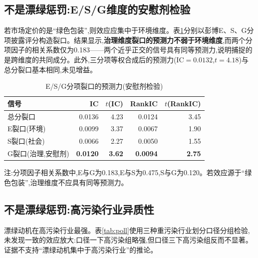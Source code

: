 \documentclass[UTF8, a4paper, fontset=fandol, zihao=-4]{ctexart}
\begin{document}
\subsection{不是漂绿惩罚:E/S/G维度的安慰剂检验}

若市场定价的是“绿色包装”,则效应应集中于环境维度。表\ref{tab:esg}分别以彭博E、S、G分项披露评分构造裂口。结果显示,\textbf{治理维度裂口的预测力不弱于环境维度},而两个分项因子的相关系数仅为0.183——两个近乎正交的信号具有同等预测力,说明捕捉的是跨维度的共同成分。此外,三分项等权合成后的预测力(IC${}=0.0132$,$t=4.18$)与总分裂口基本相同,未见增益。

\begin{table}[H]
\centering
\begin{threeparttable}
\caption{E/S/G分项裂口的预测力(安慰剂检验)}\label{tab:esg}
\begin{tabular}{lrrrr}
\toprule
信号 & IC & $t$(IC) & RankIC & $t$(RankIC) \\
\midrule
总分裂口 & 0.0136 & 4.23 & 0.0124 & 3.45 \\
E裂口(环境) & 0.0099 & 3.37 & 0.0067 & 1.90 \\
S裂口(社会) & 0.0066 & 2.27 & 0.0050 & 1.55 \\
G裂口(治理,安慰剂) & \textbf{0.0120} & \textbf{3.62} & \textbf{0.0094} & \textbf{2.75} \\
\bottomrule
\end{tabular}
\begin{tablenotes}
\item 注:分项因子相关系数中,E与G为0.183,E与S为0.475,S与G为0.120。若效应源于“绿色包装”,治理维度不应具有同等预测力。
\end{tablenotes}
\end{threeparttable}
\end{table}

\subsection{不是漂绿惩罚:高污染行业异质性}

漂绿动机在高污染行业最强。表\ref{tab:poll}使用三种重污染行业划分口径分组检验,未发现一致的效应放大:口径一下高污染组略强,但口径三下高污染组反而不显著。证据不支持“漂绿动机集中于高污染行业”的推论。
\end{document}
